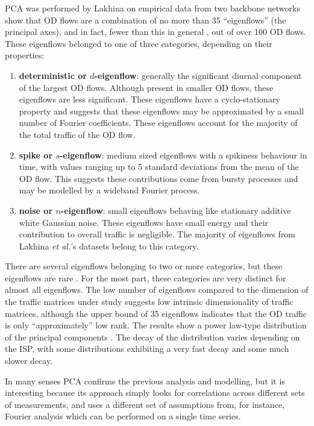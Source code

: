 PCA was performed by Lakhina \etal on empirical data from two backbone networks show
that OD flows are a combination of no more than 35 ``eigenflows'' (the principal axes), and
in fact, fewer than this in general \cite{Lakhina04TrafficStruct}, out of over 100 OD flows. 
These eigenflows belonged to one of three categories, depending on their properties:
\begin{enumerate}
\item \textbf{deterministic or $d$-eigenflow}: generally the
  significant diurnal component of the largest OD flows. Although
  present in smaller OD flows, these eigenflows are less
  significant. These eigenflows have a cyclo-stationary property and
  suggests that these eigenflows may be approximated by a small number
  of Fourier coefficients. These eigenflows account for the majority
  of the total traffic of the OD flow.
\item \textbf{spike or $s$-eigenflow}: medium sized eigenflows with a
  spikiness behaviour in time, with values ranging up to 5 standard
  deviations from the mean of the OD flow. This suggests these
  contributions come from bursty processes and may be modelled by a
  wideband Fourier process.
\item \textbf{noise or $n$-eigenflow}: small eigenflows behaving like
  stationary additive white Gaussian noise. These eigenflows have
  small energy and their contribution to overall traffic is
  negligible. The majority of eigenflows from Lakhina {\em et al.}'s datasets
  belong to this category.
\end{enumerate}
There are several eigenflows belonging to two or more categories, but
these eigenflows are rare \cite{Lakhina04TrafficStruct}.  For the most
part, these categories are very distinct for almost all
eigenflows. The low number of eigenflows compared to the dimension of
the traffic matrices under study suggests low intrinsic dimensionality
of traffic matrices, although the upper bound of 35 eigenflows indicates that the OD traffic
is only ``approximately'' low rank. The results show a power law-type distribution
of the principal components \cite{Lakhina04TrafficStruct}. The decay of the
distribution varies depending on the ISP, with some distributions
exhibiting a very fast decay and some much slower decay.

In many senses PCA confirms the previous analysis
and modelling, but it is interesting because its approach simply looks
for correlations across different sets of measurements, and uses a
different set of assumptions from, for instance, Fourier analysis
which can be performed on a single time series.

